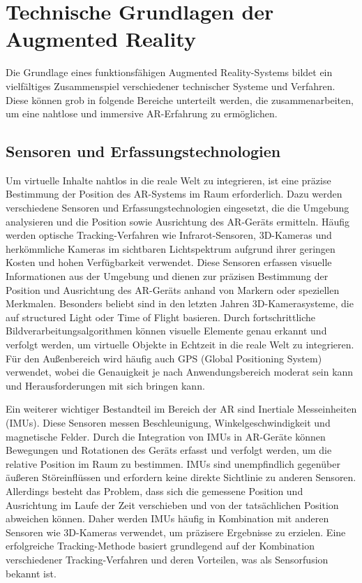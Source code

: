 \section{Technische Grundlagen der Augmented Reality}

Die Grundlage eines funktionsfähigen Augmented Reality-Systems bildet ein
vielfältiges Zusammenspiel verschiedener technischer Systeme und Verfahren.
Diese können grob in folgende Bereiche unterteilt werden, die zusammenarbeiten,
um eine nahtlose und immersive AR-Erfahrung zu ermöglichen.

\subsection{Sensoren und Erfassungstechnologien}

Um virtuelle Inhalte nahtlos in die reale Welt zu integrieren, ist eine präzise
Bestimmung der Position des AR-Systems im Raum erforderlich. Dazu werden
verschiedene Sensoren und Erfassungstechnologien eingesetzt, die die Umgebung
analysieren und die Position sowie Ausrichtung des AR-Geräts ermitteln. Häufig
werden optische Tracking-Verfahren wie Infrarot-Sensoren, 3D-Kameras und
herkömmliche Kameras im sichtbaren Lichtspektrum aufgrund ihrer geringen Kosten
und hohen Verfügbarkeit verwendet. Diese Sensoren erfassen visuelle
Informationen aus der Umgebung und dienen zur präzisen Bestimmung der Position
und Ausrichtung des AR-Geräts anhand von Markern oder speziellen Merkmalen.
Besonders beliebt sind in den letzten Jahren 3D-Kamerasysteme, die auf
structured Light oder Time of Flight basieren. Durch fortschrittliche
Bildverarbeitungsalgorithmen können visuelle Elemente genau erkannt und
verfolgt werden, um virtuelle Objekte in Echtzeit in die reale Welt zu
integrieren. Für den Außenbereich wird häufig auch GPS (Global Positioning
System) verwendet, wobei die Genauigkeit je nach Anwendungsbereich moderat sein
kann und Herausforderungen mit sich bringen kann.

Ein weiterer wichtiger Bestandteil im Bereich der AR sind Inertiale
Messeinheiten (IMUs). Diese Sensoren messen Beschleunigung,
Winkelgeschwindigkeit und magnetische Felder. Durch die Integration von IMUs in
AR-Geräte können Bewegungen und Rotationen des Geräts erfasst und verfolgt
werden, um die relative Position im Raum zu bestimmen. IMUs sind unempfindlich
gegenüber äußeren Störeinflüssen und erfordern keine direkte Sichtlinie zu
anderen Sensoren. Allerdings besteht das Problem, dass sich die gemessene
Position und Ausrichtung im Laufe der Zeit verschieben und von der
tatsächlichen Position abweichen können. Daher werden IMUs häufig in
Kombination mit anderen Sensoren wie 3D-Kameras verwendet, um präzisere
Ergebnisse zu erzielen. Eine erfolgreiche Tracking-Methode basiert grundlegend
auf der Kombination verschiedener Tracking-Verfahren und deren Vorteilen, was
als Sensorfusion bekannt ist.

